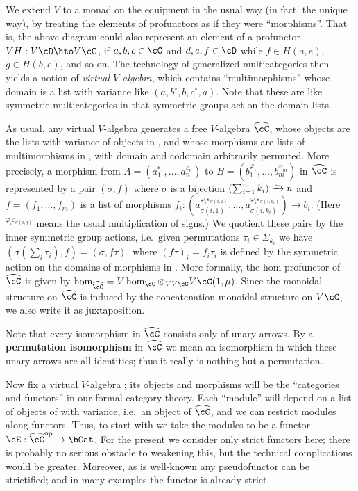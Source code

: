 \documentclass{amsart}
\newcommand{\C}{\cC}
\newcommand{\D}{\cD}
\renewcommand{\Chat}{\ensuremath{\widehat{\C}}\xspace}
\newcommand{\E}{\cE}
\renewcommand{\o}{^{\circ}}
\newcommand{\e}[1][]{^{\varepsilon_{#1}}}
\renewcommand{\ph}[1][]{^{\varphi_{#1}}}
\newcommand{\phe}[2]{^{\varphi_{#1}\varepsilon_{#2}}}
\begin{document}
We extend $V$ to a monad on the equipment \dCat in the usual way (in fact, the unique way), by treating the elements of profunctors as if they were ``morphisms''.
That is, the above diagram could also represent an element of a profunctor $V H : V \D \hto V \C$, if $a,b,c\in\C$ and $d,e,f\in \D$ while $f\in H(a,e)$, $g\in H(b,e)$, and so on.
The technology of generalized multicategories then yields a notion of \emph{virtual $V$-algebra}, which contains ``multimorphisms'' whose domain is a list with variance like $(a,b\o,b,c\o,a)$.
Note that these are like symmetric multicategories in that symmetric groups act on the domain lists.

As usual, any virtual $V$-algebra \C generates a free $V$-algebra \Chat, whose objects are the lists with variance of objects in \C, and whose morphisms are lists of multimorphisms in \C, with domain and codomain arbitrarily permuted.
More precisely, a morphism from $A=(a_1\e[1],\dots,a_n\e[n])$ to $B=(b_1\ph[1],\dots,b_m\ph[m])$ in \Chat is represented by a pair $(\sigma,f)$ where $\sigma$ is a bijection $\left(\sum_{i=1}^m k_i\right) \toiso n$ and $f=(f_1,\dots,f_m)$ is a list of morphisms $f_i:(a_{\sigma(i,1)}\phe{i}{\sigma(i,1)},\dots,a_{\sigma(i,k_i)}\phe{i}{\sigma(i,k_i)}) \to b_i$.
(Here $\phe{i}{\sigma(i,j)}$ means the usual multiplication of signs.)
We quotient these pairs by the inner symmetric group actions, i.e.\ given permutations $\tau_i\in\Sigma_{k_i}$ we have $(\sigma(\sum_i \tau_i), f) = (\sigma,f\tau)$, where $(f\tau)_i = f_i \tau_i$ is defined by the symmetric action on the domains of morphisms in \C.
More formally, the hom-profunctor of \Chat is given by $\hom_{\Chat} = V\hom_\C \otimes_{VV\C} V\C(1,\mu)$.
Since the monoidal structure on \Chat is induced by the concatenation monoidal structure on $V\C$, we also write it as juxtaposition.

Note that every isomorphism in \Chat consists only of unary arrows.
By a \textbf{permutation isomorphism} in \Chat we mean an isomorphism in which these unary arrows are all identities; thus it really is nothing but a permutation.

Now fix a virtual $V$-algebra \C; its objects and morphisms will be the ``categories and functors'' in our formal category theory.
Each ``module'' will depend on a list of objects of \C with variance, i.e.\ an object of \Chat, and we can restrict modules along functors.
Thus, to start with we take the modules to be a functor $\E:\Chat\op\to \bCat$.
For the present we consider only strict functors here; there is probably no serious obstacle to weakening this, but the technical complications would be greater.
Moreover, as is well-known any pseudofunctor can be strictified; and in many examples the functor is already strict.
\end{document}
